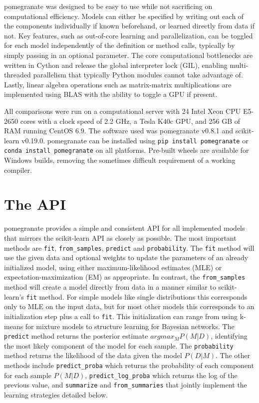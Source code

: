 \documentclass{article}
\newcommand{\code}[1]{\colorbox{light-gray}{\texttt{#1}}}
\begin{document}
pomegranate was designed to be easy to use while not sacrificing on computational efficiency. Models can either be specified by writing out each of the components individually if known beforehand, or learned directly from data if not. Key features, such as out-of-core learning and parallelization, can be toggled for each model independently of the definition or method calls, typically by simply passing in an optional parameter. The core computational bottlenecks are written in Cython and release the global interpreter lock (GIL), enabling multi-threaded parallelism that typically Python modules cannot take advantage of. Lastly, linear algebra operations such as matrix-matrix multiplications are implemented using BLAS with the ability to toggle a GPU if present.

All comparisons were run on a computational server with 24 Intel Xeon CPU E5-2650 cores with a clock speed of 2.2 GHz, a Tesla K40c GPU, and 256 GB of RAM running CentOS 6.9. The software used was pomegranate v0.8.1 and scikit-learn v0.19.0. pomegranate can be installed using \code{pip install pomegranate} or \code{conda install pomegranate} on all platforms. Pre-built wheels are available for Windows builds, removing the sometimes difficult requirement of a working compiler.

\section{The API}
pomegranate provides a simple and consistent API for all implemented models that mirrors the scikit-learn API as closely as possible. The most important methods are \code{fit}, \code{from\_samples}, \code{predict} and \code{probability}. The \code{fit} method will use the given data and optional weights to update the parameters of an already initialized model, using either maximum-likelihood estimates (MLE) or expectation-maximization (EM) as appropriate. In contrast, the \code{from\_samples} method will create a model directly from data in a manner similar to scikit-learn's \code{fit} method. For simple models like single distributions this corresponds only to MLE on the input data, but for most other models this corresponds to an initialization step plus a call to \code{fit}. This initialization can range from using k-means for mixture models to structure learning for Bayesian networks. The \code{predict} method returns the posterior estimate $argmax_{M} P(M|D)$, identifying the most likely component of the model for each sample. The \code{probability} method returns the likelihood of the data given the model $P(D|M)$. The other methods include \code{predict\_proba} which returns the probability of each component for each sample $P(M|D)$, \code{predict\_log\_proba} which returns the log of the previous value, and \code{summarize} and \code{from\_summaries} that jointly implement the learning strategies detailed below.
\end{document}
